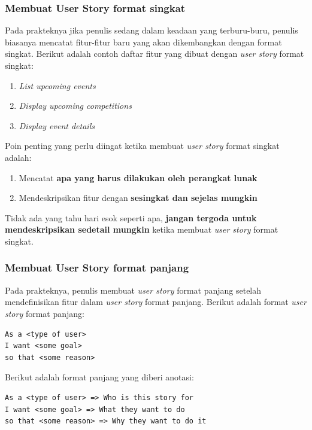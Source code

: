 \documentclass[a4paper, 12pt, oneside]{report}
\begin{document}
\newpage

\subsubsection{Membuat User Story format singkat}

\onehalfspacing Pada prakteknya jika penulis sedang dalam keadaan yang terburu-buru, penulis biasanya mencatat fitur-fitur baru yang akan dikembangkan dengan format singkat. Berikut adalah contoh daftar fitur yang dibuat dengan \textit{user story} format singkat:

\begin{enumerate}
  \item \textit{List upcoming events}
  \item \textit{Display upcoming competitions}
  \item \textit{Display event details}
\end{enumerate}

\onehalfspacing Poin penting yang perlu diingat ketika membuat \textit{user story} format singkat adalah:

\begin{enumerate}
  \item Mencatat \textbf{apa yang harus dilakukan oleh perangkat lunak}
  \item Mendeskripsikan fitur dengan \textbf{sesingkat dan sejelas mungkin}
\end{enumerate}

\onehalfspacing Tidak ada yang tahu hari esok seperti apa, \textbf{jangan tergoda untuk mendeskripsikan sedetail mungkin} ketika membuat \textit{user story} format singkat.

\subsubsection{Membuat User Story format panjang}

\onehalfspacing Pada prakteknya, penulis membuat \textit{user story} format panjang setelah mendefinisikan fitur dalam \textit{user story} format panjang. Berikut adalah format \textit{user story} format panjang:

\begin{lstlisting}[frame=single]
As a <type of user>
I want <some goal>
so that <some reason>
\end{lstlisting}

Berikut adalah format panjang yang diberi anotasi:

\begin{lstlisting}[frame=single]
As a <type of user> => Who is this story for
I want <some goal> => What they want to do
so that <some reason> => Why they want to do it
\end{lstlisting}
\end{document}
